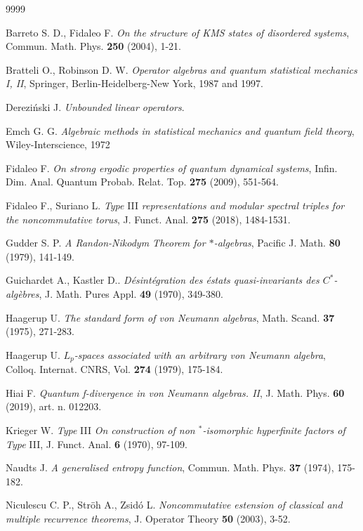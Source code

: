 \documentclass[12pt]{amsart}
\numberwithin{equation}{section}
\begin{document}
\begin{thebibliography}{9999} 

 Barreto S. D., Fidaleo F. 
{\it On the structure of KMS states of disordered systems}, 
Commun. Math. Phys. {\bf 250} (2004), 1-21.

 Bratteli O., Robinson D. W. {\it Operator algebras and
quantum statistical mechanics I, II}, Springer, Berlin-Heidelberg-New
York, 1987 and 1997.

 Derezi\'nski J. {\it Unbounded linear operators}. 

 Emch G. G. {\it Algebraic methods in statistical mechanics and quantum field theory}, Wiley-Interscience, 1972

 Fidaleo F. {\it On strong ergodic properties of quantum dynamical systems}, Infin. Dim. Anal. Quantum Probab. Relat. Top. {\bf 275} (2009), 551-564.

 Fidaleo F., Suriano L. {\it Type} III {\it representations and modular spectral triples for the noncommutative torus}, J. Funct. Anal. {\bf 275} (2018), 1484-1531. 

 Gudder S. P. {\it A Randon-Nikodym Theorem for $*$-algebras}, Pacific J. Math. {\bf 80} (1979), 141-149. 

 Guichardet A., Kastler D.. {\it D\'esint\'egration des \'estats quasi-invariants des $C^*$-alg\`ebres}, J. Math. Pures Appl. {\bf 49} (1970), 349-380. 

 Haagerup U. {\it The standard form of von Neumann algebras}, Math. Scand. {\bf 37} (1975), 271-283. 

 Haagerup U. {\it $L_p$-spaces associated with an arbitrary von Neumann algebra}, Colloq. Internat. CNRS, Vol. {\bf 274} (1979), 175-184. 

 Hiai F. {\it Quantum f-divergence in von Neumann algebras. II}, J. Math. Phys. {\bf 60} (2019), art. n. 012203. 

 Krieger W. {\it Type} III {\it On construction of non ${}^*$-isomorphic hyperfinite factors of} {\it Type} III, J. Funct. Anal. {\bf 6} (1970), 97-109. 

 Naudts J. {\it A generalised entropy function}, Commun. Math. Phys. {\bf 37} (1974), 175-182. 

 Niculescu C. P., Str\"oh A., Zsid\'o L.
{\it Noncommutative estension of classical and multiple recurrence 
theorems}, J. Operator Theory {\bf 50} (2003), 3-52.


\end{thebibliography}
\end{document}
